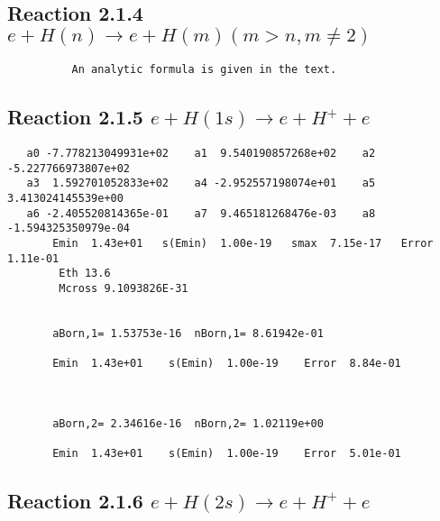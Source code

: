 \documentclass[12pt,dvipdfmx]{article}
\begin{document}
\newpage
\subsection{
Reaction 2.1.4 $   e + H(n) \rightarrow e + H(m)  (m > n, m \neq 2)$}

\begin{small}\begin{verbatim}
          An analytic formula is given in the text.
\end{verbatim}\end{small}




\newpage
\subsection{
Reaction 2.1.5 $   e + H(1s) \rightarrow e + H^+ + e$}



\begin{small}\begin{verbatim}
   a0 -7.778213049931e+02    a1  9.540190857268e+02    a2 -5.227766973807e+02
   a3  1.592701052833e+02    a4 -2.952557198074e+01    a5  3.413024145539e+00
   a6 -2.405520814365e-01    a7  9.465181268476e-03    a8 -1.594325350979e-04
       Emin  1.43e+01   s(Emin)  1.00e-19   smax  7.15e-17   Error  1.11e-01
        Eth 13.6
        Mcross 9.1093826E-31


       aBorn,1= 1.53753e-16  nBorn,1= 8.61942e-01

       Emin  1.43e+01    s(Emin)  1.00e-19    Error  8.84e-01



       aBorn,2= 2.34616e-16  nBorn,2= 1.02119e+00

       Emin  1.43e+01    s(Emin)  1.00e-19    Error  5.01e-01

\end{verbatim}\end{small}





\newpage
\subsection{
Reaction 2.1.6 $   e + H(2s) \rightarrow e + H^+ + e$}
\end{document}
